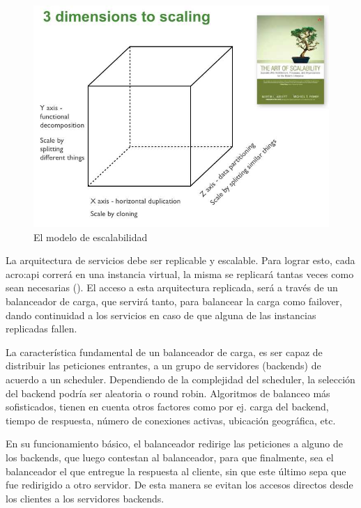 \begin{figure}[H]
  \includegraphics[width=\linewidth]{src/images/03-capitulo-3/scale_cube.jpg}
  \caption{El modelo de escalabilidad }
  \label{fig:scale-cube}
\end{figure}

La arquitectura de servicios debe ser replicable y escalable.  Para lograr esto, cada \gls{acro:api} correrá en una instancia virtual, la misma se replicará tantas veces como sean necesarias ().  El acceso a esta arquitectura replicada, será a través de un balanceador de carga, que servirá tanto, para balancear la carga como failover, dando continuidad a los servicios en caso de que alguna de las instancias replicadas fallen.

La característica fundamental de un balanceador de carga, es ser capaz de distribuir las peticiones entrantes, a un grupo de servidores (backends) de acuerdo a un scheduler.  Dependiendo de la complejidad del scheduler, la selección del backend podría ser aleatoria o round robin.  Algoritmos de balanceo más sofisticados, tienen en cuenta otros factores como por ej. carga del backend, tiempo de respuesta, número de conexiones activas, ubicación geográfica, etc.

En su funcionamiento básico, el balanceador redirige las peticiones a alguno de los backends, que luego contestan al balanceador, para que finalmente, sea el balanceador el que entregue la respuesta al cliente, sin que este último sepa que fue redirigido a otro servidor.  De esta manera se evitan los accesos directos desde los clientes a los servidores backends.

